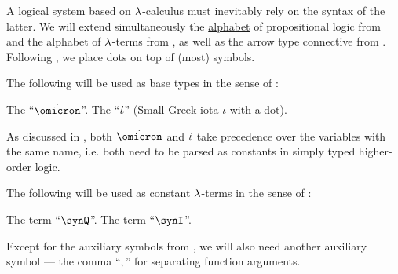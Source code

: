 \begin{definition}\label{def:simply_typed_hol_alphabet}\mimprovised
  A \hyperref[con:logical_system]{logical system} based on \( {\mathrm \lambda} \)-calculus must inevitably rely on the syntax of the latter. We will extend simultaneously the \hyperref[def:formal_language/alphabet]{alphabet} of propositional logic from  and the alphabet of \( {\mathrm \lambda} \)-terms from , as well as the arrow type connective from . Following , we place dots on top of (most) symbols.

  \begin{thmenum}
     The following will be used as base types in the sense of :
    \begin{thmenum}[series=def:simply_typed_hol_alphabet]
       The  \enquote{\( \syn\omicron \)}.
       The  \enquote{\( \dot{\iota} \)} (Small Greek iota \( \iota \) with a dot).
    \end{thmenum}

    As discussed in , both \( \syn\omicron \) and \( \dot{\iota} \) take precedence over the variables with the same name, i.e. both need to be parsed as constants in simply typed higher-order logic.

     The following will be used as constant \( {\mathrm \lambda} \)-terms in the sense of :
    \begin{thmenum}[resume=def:simply_typed_hol_alphabet]
       The  term \enquote{\( \synQ \)}.
       The  term \enquote{\( \synI \)}.
    \end{thmenum}

     Except for the auxiliary symbols from , we will also need another auxiliary symbol --- the comma \enquote{\( , \)} for separating function arguments.


\end{thmenum}
\end{definition}
